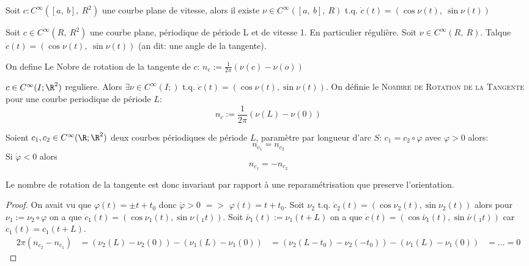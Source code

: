 		\begin{lemme}
			Soit $c:C^\infty([a,\ b],\ R^2)$ une courbe plane de vitesse, alors il existe $\nu\in C^\infty([a,\ b],\ R)$ t.q. $\dot{c}(t)=(\cos\nu(t),\ \sin\nu(t))$
		\end{lemme}

		\begin{definition}
			Soit $c\in C^\infty(R,\ R^2)$ une courbe plane, périodique de période L et de vitesse 1. En particulier régulière. Soit $\nu\in C^\infty(R,\ R)$.
			Talque $\dot{c}(t)=(\cos \nu (t),\ \sin\nu(t))$ (an dit: une angle de la tangente).
	
			On define Le Nobre de rotation de la tangente de $c$: $n_c:=\frac{1}{2\pi}(\nu(c)-\nu(o))$
		\end{definition}
\begin{rappel}
$c\in C^\infty(I; \R^2)$ reguliere. Alors $\exists\nu\in C^\infty (I; )$ t.q. $\dot{c}(t)=(\cos \nu(t), \sin\nu(t))$. On définie le \textsc{Nombre de Rotation de la Tangente} pour une courbe periodique de période $L$:
		$$n_c:=\frac{1}{2\pi}(\nu (L)-\nu(0))$$
\end{rappel}
	
		\begin{lemme}
			Soient $c_1, c_2\in C^\infty (\R; \R^2)$ deux courbes périodiques de période $L$, paramètre par longueur d'arc $S$: $c_1=c_2\circ\varphi$ avec $\varphi>0 $ alors:
			$$n_{c_1}=n_{c_2}$$
			Si $\dot{\varphi}<0$ alors
			$$n_{c_1}=-n_{c_2}$$
		\end{lemme}
		\begin{remark}
			Le nombre de rotation de la tangente est donc invariant par rapport à une reparamétrisation que preserve l'orientation.
		\end{remark}
		\begin{proof}
			On avait vu que $\varphi(t)=\pm t+t_0$ donc $\dot{\varphi}>0$ $=>$ $\varphi (t)=t+t_0$. Soit $\nu_2$ t.q. $\dot{c}_2(t)=(\cos\nu_2(t), \sin\nu_2(t))$ alors pour $\nu_1:=\nu_2\circ\varphi$ on a que $\dot{c}_1(t)=(\cos\nu_1(t), \sin\nu(_1t))$. Soit $\bar{\nu}_1(t):=\nu_1(t+L)$ on a que $\dot{c}(t)=(\cos\bar{\nu}_1(t), \sin\bar{\nu}(_1t))$ car $c_1(t)=c_1(t+L)$.
			\begin{align}
				2\pi(n_{c_2}-n_{c_1}) & = (\nu_2(L)-\nu_2(0))-(\nu_1(L)-\nu_1(0))
				& =(\nu_2(L-t_0)-\nu_2(-t_0)) - (\nu_1(L)-\nu_1(0))
				& = ...
				=0
			\end{align}
		\end{proof}


